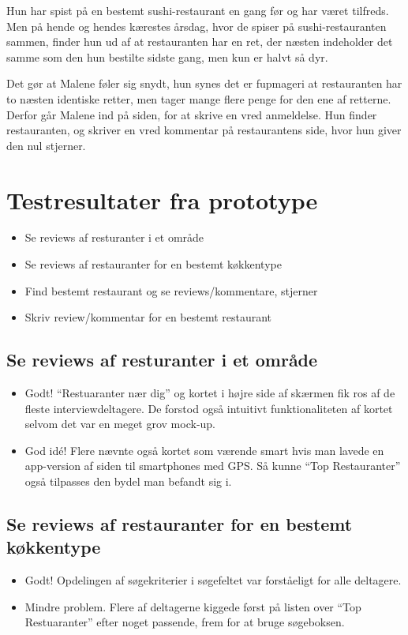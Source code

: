 \documentclass[a4paper, 12pt]{article}
\begin{document}
Hun har spist på en bestemt sushi-restaurant en gang før og har været tilfreds.
Men på hende og hendes kærestes årsdag, hvor de spiser på sushi-restauranten
sammen, finder hun ud af at restauranten har en ret, der næsten indeholder det
samme som den hun bestilte sidste gang, men kun er halvt så dyr.

Det gør at Malene føler sig snydt, hun synes det er fupmageri at restauranten
har to næsten identiske retter, men tager mange flere penge for den ene af
retterne. Derfor går Malene ind på siden, for at skrive en vred anmeldelse.  Hun
finder restauranten, og skriver en vred kommentar på restaurantens side, hvor
hun giver den nul stjerner.
\section{Testresultater fra prototype}
\label{sec:Testresultater fra prototype}

\begin{itemize}
\item Se reviews af resturanter i et område
\item Se reviews af restauranter for en bestemt køkkentype
\item Find bestemt restaurant og se reviews/kommentare, stjerner
\item Skriv review/kommentar for en bestemt restaurant
\end{itemize}

\subsection{Se reviews af resturanter i et område}
\begin{itemize}
\item Godt! ``Restuaranter nær dig'' og kortet i højre side af skærmen fik ros af de fleste interviewdeltagere. De forstod også intuitivt funktionaliteten af kortet selvom det var en meget grov mock-up.
\item God idé! Flere nævnte også kortet som værende smart hvis man lavede en app-version af siden til smartphones med GPS. Så kunne ``Top Restauranter'' også tilpasses den bydel man befandt sig i.
\end{itemize}

\subsection{Se reviews af restauranter for en bestemt køkkentype}
\begin{itemize}
\item Godt! Opdelingen af søgekriterier i søgefeltet var forståeligt for alle deltagere.
\item Mindre problem. Flere af deltagerne kiggede først på listen over ``Top Restuaranter'' efter noget passende, frem for at bruge søgeboksen. 
\end{itemize}
\end{document}

